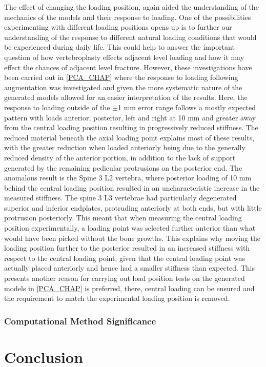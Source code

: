 The effect of changing the loading position, again aided the understanding of
the mechanics of the models and their response to loading. One of the
possibilities experimenting with different loading positions opens up is to
further our understanding of the response to different natural loading
conditions that would be experienced during daily life. This could help to
answer the important question of how vertebroplasty effects adjacent level
loading and how it may effect the chances of adjacent level fracture. However,
these investigations have been carried out in \cref{PCA_CHAP} where the
response to loading following augmentation was investigated and given the more
systematic nature of the generated models allowed for an easier interpretation
of the results. Here, the response to loading outside of the $\pm$1 mm error
range follows a mostly expected pattern with loads anterior, posterior, left
and right at 10 mm and greater away from the central loading position resulting
in progressively reduced stiffness. The reduced material beneath the axial
loading point explains most of these results, with the greater reduction when
loaded anteriorly being due to the generally reduced density of the anterior
portion, in addition to the lack of support generated by the remaining
pedicular protrusions on the posterior end. The anomalous result is the Spine 3
L2 vertebra, where posterior loading of 10 mm behind the central loading
position resulted in an uncharacteristic increase in the measured stiffness.
The spine 3 L3 vertebrae had particularly degenerated superior and inferior
endplates, protruding anteriorly at both ends, but with little protrusion
posteriorly.  This meant that when measuring the central loading position
experimentally, a loading point was selected further anterior than what would
have been picked without the bone growths. This explains why moving the loading
position further to the posterior resulted in an increased stiffness with
respect to the central loading point, given that the central loading point was
actually placed anteriorly and hence had a smaller stiffness than expected.
This presents another reason for carrying out load position tests on the
generated models in \cref{PCA_CHAP} is preferred, there, central loading can be
ensured and the requirement to match the experimental loading position is
removed.


\subsubsection{Computational Method Significance}

\section{Conclusion}







